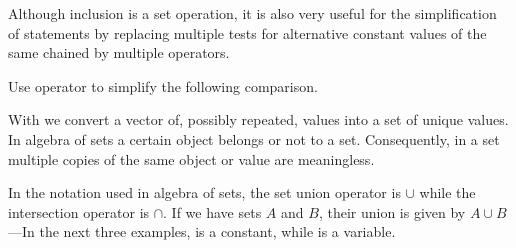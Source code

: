 \documentclass[krantz2]{krantz}\usepackage{knitr}%
\begin{document}
Although inclusion is a set operation, it is also very useful for the simplification of  statements by replacing multiple tests for alternative constant values of the same  chained by multiple \Roperator{|} operators.

\begin{playground}
Use operator  to simplify the following comparison.
\begin{knitrout}\footnotesize
{}\color{fgcolor}\begin{kframe}
\begin{alltt}
 \hlkwb{<-} \hlstd{(}\hlstd{,} \hlstd{,} \hlstd{)}
 \hlopt{==}  \hlopt{|}  \hlopt{==}  \hlopt{|}  \hlopt{==}  \hlopt{|}  \hlopt{==} 
\end{alltt}
\end{kframe}
\end{knitrout}
\end{playground}

With  we convert a vector of, possibly repeated, values into a set of unique values. In algebra of sets a certain object belongs or not to a set. Consequently, in a set multiple copies of the same object or value are meaningless.

\begin{knitrout}\footnotesize
{}\color{fgcolor}
\end{knitrout}

In the notation used in algebra of sets, the set union operator is $\cup$ while the intersection operator is $\cap$. If we have sets $A$ and $B$, their union is given by $A \cup B$---In the next three examples,  is a constant, while  is a variable.
\end{document}
